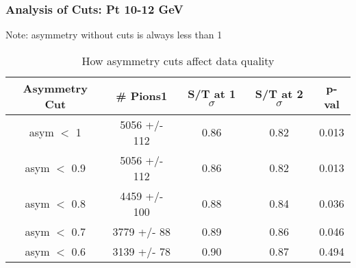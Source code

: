 \frame
{
\frametitle{Analysis of Cuts: Pt 10-12 GeV}
Note: asymmetry without cuts is always less than 1
\begin{table}
\caption{How asymmetry cuts affect data quality}
\centering
\begin{tabular}{c c c c c}
\hline\hline
Asymmetry Cut & \# Pions1 & S/T at 1 $\sigma$ & S/T at 2 $\sigma$ & p-val \\ [0.5ex]
\hline
asym $<$ 1 & 5056 +/-  112 & 0.86 & 0.82 & 0.013 \\ %
asym $<$ 0.9 & 5056 +/-  112 & 0.86 & 0.82 & 0.013 \\ %
asym $<$ 0.8 & 4459 +/-  100 & 0.88 & 0.84 & 0.036 \\ %
asym $<$ 0.7 & 3779 +/-   88 & 0.89 & 0.86 & 0.046 \\ %
asym $<$ 0.6 & 3139 +/-   78 & 0.90 & 0.87 & 0.494 \\ %
[1ex]
\hline
\end{tabular}
\label{table:nonlin}
\end{table}
}
